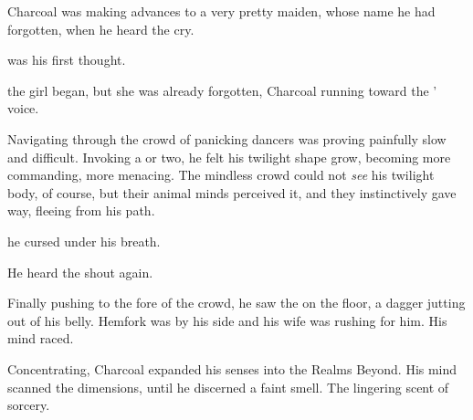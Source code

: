 \begin{comment}
\subsection{Charcoal}
\end{comment}
\begin{garbage}
\new
Charcoal was making advances to a very pretty maiden, whose name he had forgotten, when he heard the cry. 


 was his first thought.

 the girl began, but she was already forgotten, Charcoal running toward the \rinyuth' voice. 

Navigating through the crowd of panicking dancers was proving painfully slow and difficult. 
Invoking a \Qliphah{} or two, he felt his twilight shape grow, becoming more commanding, more menacing. 
The mindless crowd could not \emph{see} his twilight body, of course, but their animal minds perceived it, and they instinctively gave way, fleeing from his path. 

\tho{\Machai,} he cursed under his breath.  

He heard the \rinyuth shout again. 

Finally pushing to the fore of the crowd, he saw the \rayuth on the floor, a dagger jutting out of his belly. 
\Risvet{} Hemfork was by his side and his wife was rushing for him. 
His mind raced. 


Concentrating, Charcoal expanded his senses into the Realms Beyond.  His mind scanned the dimensions, until he discerned a faint smell. The lingering scent of sorcery. 


\end{garbage}
